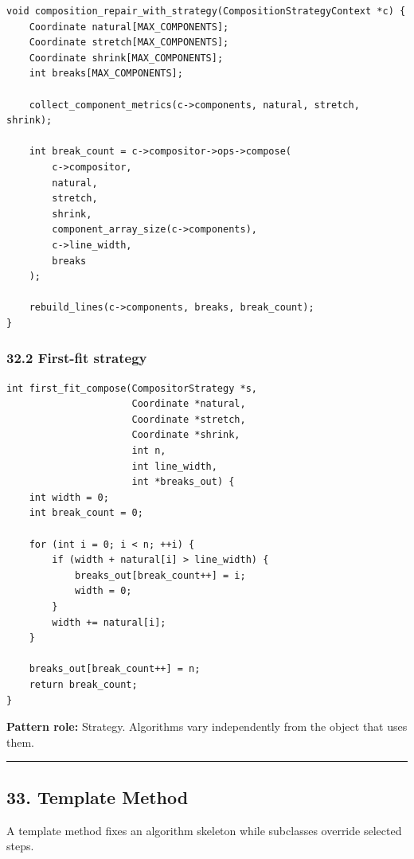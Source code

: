 \documentclass[11pt]{article}
\begin{document}
\begin{verbatim}
void composition_repair_with_strategy(CompositionStrategyContext *c) {
    Coordinate natural[MAX_COMPONENTS];
    Coordinate stretch[MAX_COMPONENTS];
    Coordinate shrink[MAX_COMPONENTS];
    int breaks[MAX_COMPONENTS];

    collect_component_metrics(c->components, natural, stretch, shrink);

    int break_count = c->compositor->ops->compose(
        c->compositor,
        natural,
        stretch,
        shrink,
        component_array_size(c->components),
        c->line_width,
        breaks
    );

    rebuild_lines(c->components, breaks, break_count);
}
\end{verbatim}

\subsubsection{32.2 First-fit strategy}\label{first-fit-strategy}

\begin{verbatim}
int first_fit_compose(CompositorStrategy *s,
                      Coordinate *natural,
                      Coordinate *stretch,
                      Coordinate *shrink,
                      int n,
                      int line_width,
                      int *breaks_out) {
    int width = 0;
    int break_count = 0;

    for (int i = 0; i < n; ++i) {
        if (width + natural[i] > line_width) {
            breaks_out[break_count++] = i;
            width = 0;
        }
        width += natural[i];
    }

    breaks_out[break_count++] = n;
    return break_count;
}
\end{verbatim}

\textbf{Pattern role:} Strategy. Algorithms vary independently from the object that uses them.

\begin{center}\rule{0.5\linewidth}{0.5pt}\end{center}

\subsection{33. Template Method}\label{template-method}

A template method fixes an algorithm skeleton while subclasses override selected steps.
\end{document}
